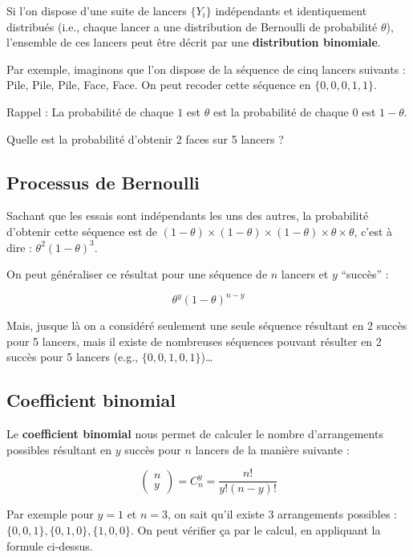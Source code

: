 \documentclass[
  a4paper,11pt,twoside,onecolumn,openright,final,oldfontcommands]{memoir}
\theoremstyle{definition}
\theoremstyle{definition}
\theoremstyle{definition}
\theoremstyle{definition}
\theoremstyle{remark}
\begin{document}
Si l'on dispose d'une suite de lancers \(\{Y_i\}\) indépendants et identiquement distribués (i.e., chaque lancer a une distribution de Bernoulli de probabilité \(\theta\)), l'ensemble de ces lancers peut être décrit par une \textbf{distribution binomiale}.

Par exemple, imaginons que l'on dispose de la séquence de cinq lancers suivants : Pile, Pile, Pile, Face, Face. On peut recoder cette séquence en \(\{0, 0, 0, 1, 1\}\).

Rappel : La probabilité de chaque \(1\) est \(\theta\) est la probabilité de chaque \(0\) est \(1 - \theta\).

Quelle est la probabilité d'obtenir 2 faces sur 5 lancers ?

\hypertarget{processus-de-bernoulli-1}{%
\subsection{Processus de Bernoulli}\label{processus-de-bernoulli-1}}

Sachant que les essais sont indépendants les uns des autres, la probabilité d'obtenir cette séquence est de \((1 - \theta) \times (1 - \theta) \times (1 - \theta) \times \theta \times \theta\), c'est à dire : \(\theta^{2} (1 - \theta)^{3}\).

On peut généraliser ce résultat pour une séquence de \(n\) lancers et \(y\) ``succès'' :

\[\theta^{y} (1 - \theta)^{n - y}\]

Mais, jusque là on a considéré seulement une seule séquence résultant en 2 succès pour 5 lancers, mais il existe de nombreuses séquences pouvant résulter en 2 succès pour 5 lancers (e.g., \(\{0, 0, 1, 0, 1\}\))\ldots{}

\hypertarget{coefficient-binomial-1}{%
\subsection{Coefficient binomial}\label{coefficient-binomial-1}}

Le \textbf{coefficient binomial} nous permet de calculer le nombre d'arrangements possibles résultant en \(y\) succès pour \(n\) lancers de la manière suivante :

\[
\left(\begin{array}{l} n \\ y \end{array}\right) = C_{n}^{y} = \frac{n !}{y !(n - y) !}
\]

Par exemple pour \(y = 1\) et \(n = 3\), on sait qu'il existe 3 arrangements possibles : \(\{0, 0, 1\}, \{0, 1, 0\}, \{1, 0, 0\}\). On peut vérifier ça par le calcul, en appliquant la formule ci-dessus.
\end{document}
